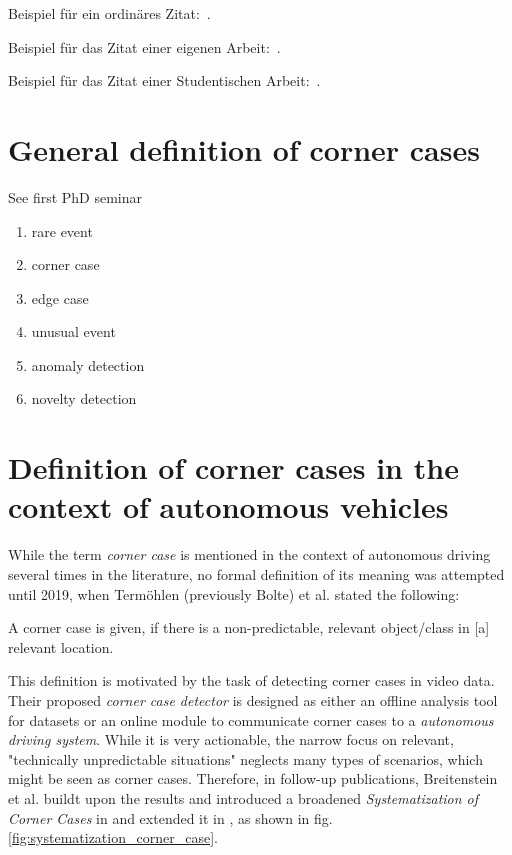 Beispiel für ein ordinäres Zitat:~\cite{Schwarzer05adaptivedynamic}.

Beispiel für das Zitat einer eigenen Arbeit:~.

Beispiel für das Zitat einer Studentischen Arbeit:~.

\section{General definition of corner cases}

See first PhD seminar
\begin{enumerate}
    \item rare event
    \item corner case
    \item edge case
    \item unusual event \cite{bolte_towards_2019}
    \item anomaly detection \cite{bolte_towards_2019}
    \item novelty detection \cite{bolte_towards_2019}
\end{enumerate}

\section{Definition of corner cases in the context of autonomous vehicles}


While the term \emph{corner case} is mentioned in the context of autonomous driving several times in the literature, no formal definition of its meaning was attempted until 2019, when Termöhlen (previously Bolte) et al. stated the following:

\begin{displayquote}
A corner case is given, if there is a non-predictable, 
relevant object/class in [a] relevant location.
\end{displayquote}

This definition is motivated by the task of detecting corner cases in video data. Their proposed \emph{corner case detector} is designed as either an offline analysis tool for datasets or an online module to communicate corner cases to a \emph{autonomous driving system}. While it is very actionable, the narrow focus on relevant, "technically unpredictable situations" neglects many types of scenarios, which might be seen as corner cases.
Therefore, in follow-up publications, Breitenstein et al. buildt upon the results and introduced a broadened \emph{Systematization of Corner Cases} in \cite{ breitenstein_systematization_2020} and extended it in \cite{breitenstein_corner_2020}, as shown in fig. \ref{fig:systematization_corner_case}.

